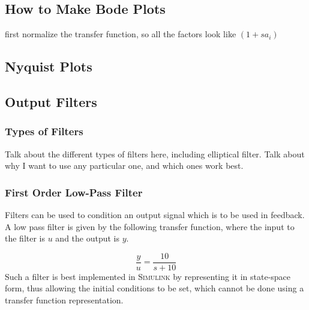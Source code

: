 \subsection{How to Make Bode Plots}

first normalize the transfer function, so all the factors look like $(1+sa_{i})$

\subsection{Nyquist Plots}

\subsection{Output Filters}

\subsubsection{Types of Filters}

Talk about the different types of filters here, including elliptical filter.
Talk about why I want to use any particular one, and which ones work best.

\subsubsection{First Order Low-Pass Filter}

Filters can be used to condition an output signal which is to be used in feedback.
A low pass filter is given by the following transfer function, where the input to the filter is $u$ and the output is $y$.

\begin{equation*}
  \frac{y}{u}=\frac{10}{s+10}
\end{equation*}
Such a filter is best implemented in \textsc{Simulink} by representing it in state-space form, thus allowing the initial conditions to be set, which cannot be done using a transfer function representation.

